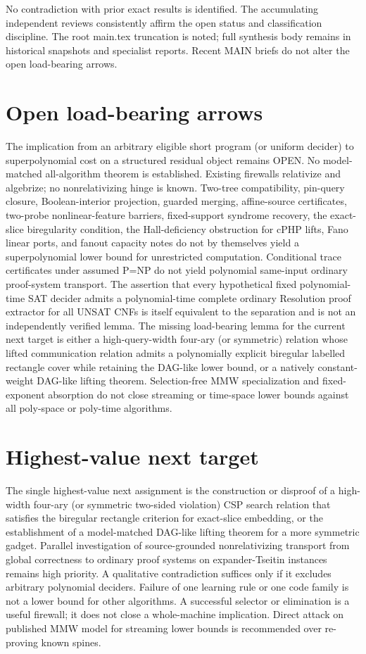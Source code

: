 \documentclass[11pt]{article}
\begin{document}
No contradiction with prior exact results is identified. The accumulating independent reviews consistently affirm the open status and classification discipline. The root main.tex truncation is noted; full synthesis body remains in historical snapshots and specialist reports. Recent MAIN briefs do not alter the open load-bearing arrows.

\section{Open load-bearing arrows}
The implication from an arbitrary eligible short program (or uniform decider) to superpolynomial cost on a structured residual object remains OPEN. No model-matched all-algorithm theorem is established. Existing firewalls relativize and algebrize; no nonrelativizing hinge is known. Two-tree compatibility, pin-query closure, Boolean-interior projection, guarded merging, affine-source certificates, two-probe nonlinear-feature barriers, fixed-support syndrome recovery, the exact-slice biregularity condition, the Hall-deficiency obstruction for cPHP lifts, Fano linear ports, and fanout capacity notes do not by themselves yield a superpolynomial lower bound for unrestricted computation. Conditional trace certificates under assumed P=NP do not yield polynomial same-input ordinary proof-system transport. The assertion that every hypothetical fixed polynomial-time SAT decider admits a polynomial-time complete ordinary Resolution proof extractor for all UNSAT CNFs is itself equivalent to the separation and is not an independently verified lemma. The missing load-bearing lemma for the current next target is either a high-query-width four-ary (or symmetric) relation whose lifted communication relation admits a polynomially explicit biregular labelled rectangle cover while retaining the DAG-like lower bound, or a natively constant-weight DAG-like lifting theorem. Selection-free MMW specialization and fixed-exponent absorption do not close streaming or time-space lower bounds against all poly-space or poly-time algorithms.

\section{Highest-value next target}
The single highest-value next assignment is the construction or disproof of a high-width four-ary (or symmetric two-sided violation) CSP search relation that satisfies the biregular rectangle criterion for exact-slice embedding, or the establishment of a model-matched DAG-like lifting theorem for a more symmetric gadget. Parallel investigation of source-grounded nonrelativizing transport from global correctness to ordinary proof systems on expander-Tseitin instances remains high priority. A qualitative contradiction suffices only if it excludes arbitrary polynomial deciders. Failure of one learning rule or one code family is not a lower bound for other algorithms. A successful selector or elimination is a useful firewall; it does not close a whole-machine implication. Direct attack on published MMW model for streaming lower bounds is recommended over re-proving known spines.
\end{document}
